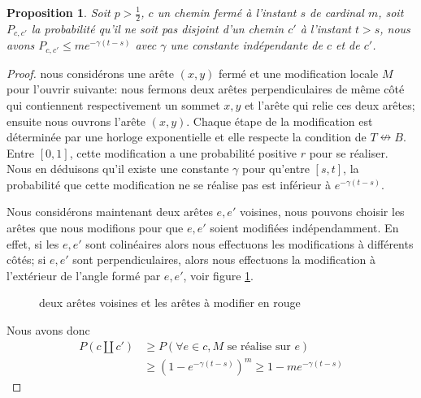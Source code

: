 \documentclass[titlepage,a4paper,12pt]{article}
\newcounter{prop}
\newtheorem{decexp}[prop]{Proposition}
\begin{document}
\begin{decexp}
Soit $p>\frac{1}{2}$, $c$ un chemin fermé à l'instant $s$ de cardinal $m$, soit $P_{c,c'}$ la probabilité qu'il ne soit pas disjoint d'un chemin $c'$ à l'instant $t>s$, nous avons $P_{c,c'}\leqslant me^{-\gamma(t-s)}$ avec $\gamma$ une constante indépendante de $c$ et de $c'$.
\end{decexp}
\begin{proof}
nous considérons une arête $(x,y)$ fermé et une modification locale $M$ pour l'ouvrir suivante: nous fermons deux arêtes perpendiculaires de même côté qui contiennent respectivement un sommet $x,y$ et l'arête qui relie ces deux arêtes; ensuite nous ouvrons l'arête $(x,y)$. Chaque étape de la modification est déterminée par une horloge exponentielle et elle respecte la condition de $T\nleftrightarrow B$. Entre $[0,1]$, cette modification a une probabilité positive $r$ pour se réaliser. Nous en déduisons qu'il existe une constante $\gamma$ pour qu'entre $[s,t]$, la probabilité que cette modification ne se réalise pas est inférieur à $e^{-\gamma(t-s)}$. 

Nous considérons maintenant deux arêtes $e,e'$ voisines, nous pouvons choisir les arêtes que nous modifions pour que $e,e'$ soient modifiées indépendamment. En effet, si les $e,e'$ sont colinéaires alors nous effectuons les modifications à différents côtés; si $e,e'$ sont perpendiculaires, alors nous effectuons la modification à l'extérieur de l'angle formé par $e,e'$, voir figure \ref{fig:mod}.

\begin{figure}[h]

\begin{minipage}{0.45\linewidth}
\center
{}
\end{minipage}
\hfill
\begin{minipage}{0.45\linewidth}
\center
{}
\end{minipage}
\caption{deux arêtes voisines et les arêtes à modifier en rouge}
\label{fig:mod}

\end{figure}

Nous avons donc 
\begin{align*}
 P(c \coprod c') &\geqslant P(\forall e \in c, M \text{ se réalise sur } e) \\
 & \geqslant (1-e^{-\gamma (t-s)})^m \geqslant 1-me^{-\gamma (t-s)}
\end{align*} 
\end{proof}
\end{document}
